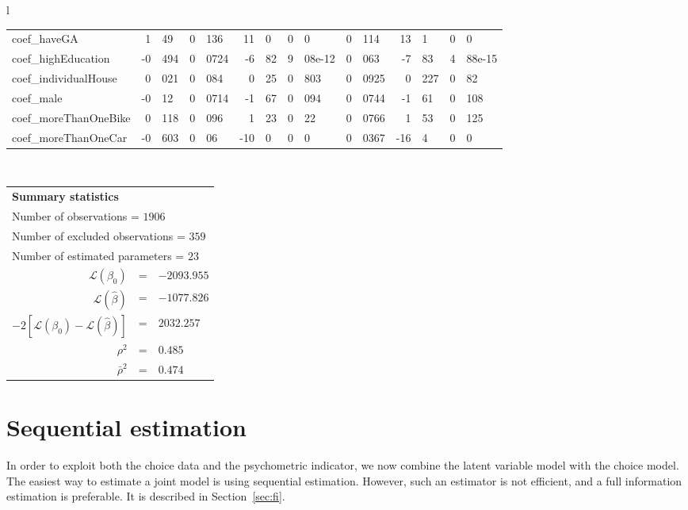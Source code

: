 \documentclass[12pt,a4paper]{article}
\begin{document}
\begin{sidewaystable}[htb]
\begin{tabular}{l}
\begin{tabular}{lr@{.}lr@{.}lr@{.}lr@{.}lr@{.}lr@{.}lr@{.}l}
coef\_haveGA                &    1&49 &    0&136 &    11&0 &      0&0 &         0&114 &         13&1 &           0&0 \\
coef\_highEducation         &  -0&494 &   0&0724 &   -6&82 & 9&08e-12 &         0&063 &        -7&83 &      4&88e-15 \\
coef\_individualHouse       &   0&021 &    0&084 &    0&25 &    0&803 &        0&0925 &        0&227 &          0&82 \\
coef\_male                  &   -0&12 &   0&0714 &   -1&67 &    0&094 &        0&0744 &        -1&61 &         0&108 \\
coef\_moreThanOneBike       &   0&118 &    0&096 &    1&23 &     0&22 &        0&0766 &         1&53 &         0&125 \\
coef\_moreThanOneCar        &  -0&603 &     0&06 &   -10&0 &      0&0 &        0&0367 &        -16&4 &           0&0 \\

\hline
\end{tabular}
\\
\begin{tabular}{rcl}
\multicolumn{3}{l}{\bf Summary statistics}\\
\multicolumn{3}{l}{ Number of observations = $1906$} \\
\multicolumn{3}{l}{ Number of excluded observations = $359$} \\
\multicolumn{3}{l}{ Number of estimated  parameters = $23$} \\
 $\mathcal{L}(\beta_0)$ &=&  $-2093.955$ \\
 $\mathcal{L}(\hat{\beta})$ &=& $-1077.826 $  \\
 $-2[\mathcal{L}(\beta_0) -\mathcal{L}(\hat{\beta})]$ &=& $2032.257$ \\
    $\rho^2$ &=&   $0.485$ \\
    $\bar{\rho}^2$ &=&    $0.474$ \\
\end{tabular}
  \end{tabular}
\end{sidewaystable}


\clearpage 

\section{Sequential estimation}

In order to exploit both the choice data and the psychometric
indicator, we now combine the latent variable model with the choice
model. The easiest way to estimate a joint model is using sequential
estimation. However, such an estimator is not efficient, and a full
information estimation is preferable. It is described in Section~\ref{sec:fi}.
\end{document}
